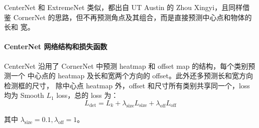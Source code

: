 CenterNet 和 ExtremeNet 类似，都出自 UT Austin 的 Zhou Xingyi，且同样借
鉴 CornerNet 的思路，但不再预测角点及其组合，而是直接预测中心点和物体的长和
宽。

\paragraph{CenterNet 网络结构和损失函数}
CenterNet 沿用了 CornerNet 中预测 heatmap 和 offset map 的结构，每个类别预测一个
中心点的 heatmap 及长和宽两个方向的 offset。此外还多预测长和宽方向检测框的尺寸，
除中心点 heatmap 外，offset 和尺寸所有类别共享同一个，loss 均为 Smooth $L_1$
loss，总的 loss 为：
\begin{equation}
  \label{equ:extreme-net-loss}
  L_{\mathrm{det}} = L_k + \lambda_{\mathrm{size}}L_{\mathrm{size}} + \lambda_{\mathrm{off}}L_{\mathrm{off}}
\end{equation}

其中 $\lambda_{\mathrm{size}}=0.1, \lambda_{\mathrm{off}}=1$。


